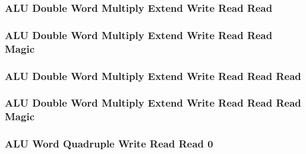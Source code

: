 

\subsubsection[{\small ALU Double Word Multiply Extend Write Read Read}]{ALU Double Word Multiply Extend Write Read Read} \label{sec:format-ALU-DMEWRR}



\subsubsection[{\small ALU Double Word Multiply Extend Write Read Read Magic}]{ALU Double Word Multiply Extend Write Read Read Magic} \label{sec:format-ALU-DMEWRR.M}



\subsubsection[{\small ALU Double Word Multiply Extend Write Read Read Read}]{ALU Double Word Multiply Extend Write Read Read Read} \label{sec:format-ALU-DMEWRRR}



\subsubsection[{\small ALU Double Word Multiply Extend Write Read Read Read Magic}]{ALU Double Word Multiply Extend Write Read Read Read Magic} \label{sec:format-ALU-DMEWRRR.M}



\subsubsection[{\small ALU Word Quadruple Write Read Read 0}]{ALU Word Quadruple Write Read Read 0} \label{sec:format-ALU-QWRR0}

